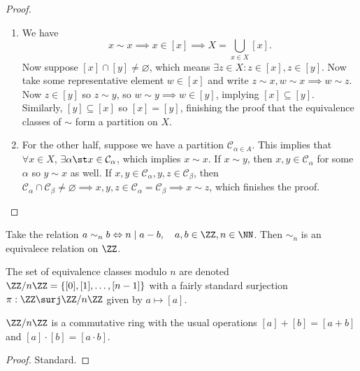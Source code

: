 \begin{proof}
$ $\\
\begin{enumerate}
\item We have
\[ x \sim x \implies x \in [x] \implies X = \bigcup_{x \in X} [x]. \]
Now suppose $[x] \cap [y] \neq \varnothing$, which means $\exists z \in
X : z \in [x], z \in [y]$. Now take some representative element $w \in
[x]$ and write $z \sim x, w \sim x \implies w \sim z$. Now $z \in [y]$
so $z \sim y$, so $w \sim y \implies w \in [y]$, implying $[x] \subseteq
[y]$. Similarly, $[y] \subseteq [x]$ so $[x] = [y]$, finishing the proof
that the equivalence classes of $\sim$ form a partition on $X$.

\item For the other half, suppose we have a partition
$\mathcal{C}_{\alpha \in A}$. This implies that $\forall x \in X$,
$\exists \alpha \st x \in \mathcal{C}_\alpha$, which implies $x \sim x$.
If $x \sim y$, then $x, y \in \mathcal{C}_\alpha$ for some $\alpha$ so
$y \sim x$ as well. If $x, y \in \mathcal{C}_\alpha, y, z \in
\mathcal{C}_\beta$, then $\mathcal{C}_\alpha \cap \mathcal{C}_\beta \neq
\varnothing \implies x, y, z \in \mathcal{C}_\alpha = \mathcal{C}_\beta
\implies x \sim z$, which finishes the proof.
\end{enumerate}
\end{proof}

\begin{ex}
Take the relation $a \sim_n b \Leftrightarrow n \mid a - b, \quad a, b
\in \ZZ, n \in \NN$. Then $\sim_n$ is an equivalece relation on $\ZZ$.
\end{ex}

\begin{df}
The set of equivalence classes modulo $n$ are denoted $\ZZ/n\ZZ =
\lbrace [0], [1], \dots, [n - 1] \rbrace$ with a fairly standard
surjection $\pi : \ZZ \surj \ZZ/n\ZZ$ given by $a \mapsto [a]$.
\end{df}

\begin{thm}
$\ZZ/n\ZZ$ is a commutative ring with the usual operations $[a] + [b] =
[a + b]$ and $[a] \cdot [b] = [a \cdot b]$.
\end{thm}

\begin{proof}
Standard.
\end{proof}
